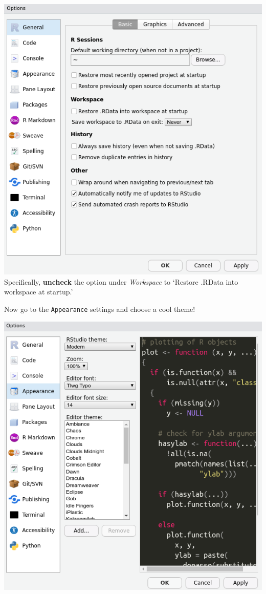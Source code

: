 \documentclass[]{book}
\begin{document}
\includegraphics{img/rstudio_settings.png}
Specifically, \textbf{uncheck} the option under \emph{Workspace} to `Restore .RData into workspace at startup.'

Now go to the \texttt{Appearance} settings and choose a cool theme!

\includegraphics{img/rstudio_theme.png}
\end{document}
